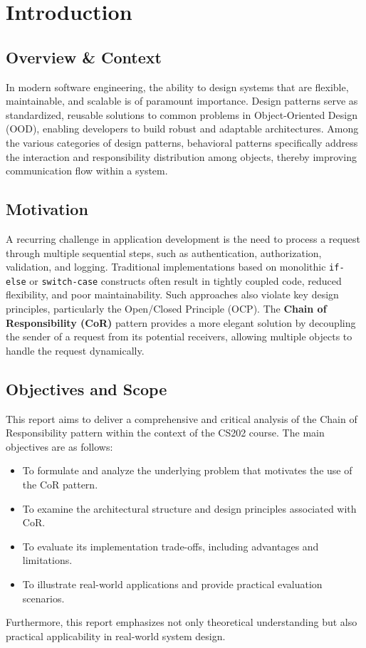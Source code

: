 \section{Introduction}

\subsection{Overview \& Context}
In modern software engineering, the ability to design systems that are flexible, maintainable, and scalable is of paramount importance. Design patterns serve as standardized, reusable solutions to common problems in Object-Oriented Design (OOD), enabling developers to build robust and adaptable architectures. Among the various categories of design patterns, behavioral patterns specifically address the interaction and responsibility distribution among objects, thereby improving communication flow within a system.

\subsection{Motivation}
A recurring challenge in application development is the need to process a request through multiple sequential steps, such as authentication, authorization, validation, and logging. Traditional implementations based on monolithic \texttt{if-else} or \texttt{switch-case} constructs often result in tightly coupled code, reduced flexibility, and poor maintainability. Such approaches also violate key design principles, particularly the Open/Closed Principle (OCP). The \textbf{Chain of Responsibility (CoR)} pattern provides a more elegant solution by decoupling the sender of a request from its potential receivers, allowing multiple objects to handle the request dynamically.

\subsection{Objectives and Scope}
This report aims to deliver a comprehensive and critical analysis of the Chain of Responsibility pattern within the context of the CS202 course. The main objectives are as follows:
\begin{itemize}
    \item To formulate and analyze the underlying problem that motivates the use of the CoR pattern.
    \item To examine the architectural structure and design principles associated with CoR.
    \item To evaluate its implementation trade-offs, including advantages and limitations.
    \item To illustrate real-world applications and provide practical evaluation scenarios.
\end{itemize}
Furthermore, this report emphasizes not only theoretical understanding but also practical applicability in real-world system design.

